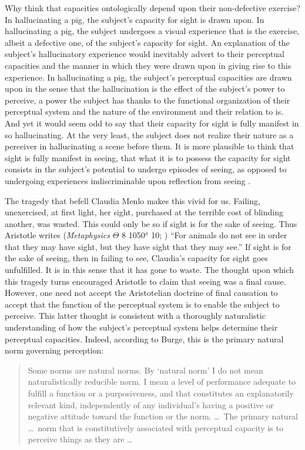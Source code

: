 \documentclass[12pt]{article}
\begin{document}
Why think that capacities ontologically depend upon their non-defective exercise? In hallucinating a pig, the subject's capacity for sight is drawn upon. In hallucinating a pig, the subject undergoes a visual experience that is the exercise, albeit a defective one, of the subject's capacity for sight. An explanation of the subject's hallucinatory experience would inevitably advert to their perceptual capacities and the manner in which they were drawn upon in giving rise to this experience. In hallucinating a pig, the subject's perceptual capacities are drawn upon in the sense that the hallucination is the effect of the subject's power to perceive, a power the subject has thanks to the functional organization of their perceptual system and the nature of the environment and their relation to is. And yet it would seem odd to say that their capacity for sight is fully manifest in so hallucinating. At the very least, the subject does not realize their nature as a perceiver in hallucinating a scene before them. It is more plausible to think that sight is fully manifest in seeing, that what it is to possess the capacity for sight consists in the subject's potential to undergo episodes of seeing, as opposed to undergoing experiences indiscriminable upon reflection from seeing \citep[compare][especially p. 72]{Martin:2004fj}.

The tragedy that befell Claudia Menlo makes this vivid for us. Failing, unexercised, at first light, her sight, purchased at the terrible cost of blinding another, was wasted. This could only be so if sight is for the sake of seeing. Thus Aristotle writes (\emph{Metaphysics} \( \Theta \) 8 1050\( ^{a} \) 10; \citealt{Barnes:1984kx}) ``For animals do not see in order that they may have sight, but they have sight that they may see.'' If sight is for the sake of seeing, then in failing to see, Claudia's capacity for sight goes unfulfilled. It is in this sense that it has gone to waste. The thought upon which this tragedy turns encouraged Aristotle to claim that seeing was a final cause. However, one need not accept the Aristotelian doctrine of final causation to accept that the function of the perceptual system is to enable the subject to perceive. This latter thought is consistent with a thoroughly naturalistic understanding of how the subject's perceptual system helps determine their perceptual capacities. Indeed, according to Burge, this is the primary natural norm governing perception:
\begin{quote}
	Some norms are natural norms. By ‘natural norm’ I do not mean naturalistically reducible norm. I mean a level of performance adequate to fulfill a function or a purposiveness, and that constitutes an explanatorily relevant kind, independently of any individual’s having a positive or negative attitude toward the function or the norm. \ldots\ The primary natural \dots\ norm that is constitutively associated with perceptual capacity is to perceive things as they are \ldots\ \citep[311--312]{Burge:2010uq}
\end{quote}
\end{document}
